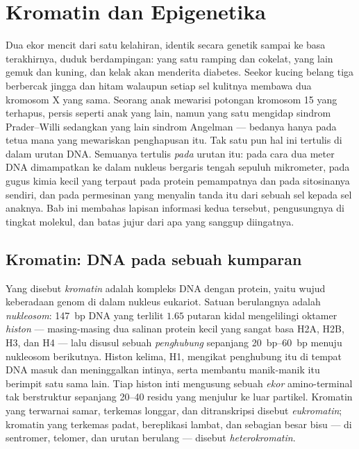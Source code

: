 \chapter{Kromatin dan Epigenetika}\label{ch:b3:chromatin-epigenetics}

Dua ekor mencit dari satu kelahiran, identik secara genetik sampai ke basa
terakhirnya, duduk berdampingan: yang satu ramping dan cokelat, yang lain
gemuk dan kuning, dan kelak akan menderita diabetes. Seekor kucing belang
tiga berbercak jingga dan hitam walaupun setiap sel kulitnya membawa dua
kromosom X yang sama. Seorang anak mewarisi potongan kromosom 15 yang
terhapus, persis seperti anak yang lain, namun yang satu mengidap sindrom
Prader--Willi sedangkan yang lain sindrom Angelman --- bedanya hanya pada
tetua mana yang mewariskan penghapusan itu. Tak satu pun hal ini tertulis di
dalam urutan DNA. Semuanya tertulis \emph{pada} urutan itu: pada cara dua
meter DNA dimampatkan ke dalam nukleus bergaris tengah sepuluh mikrometer,
pada gugus kimia kecil yang terpaut pada protein pemampatnya dan pada
sitosinanya sendiri, dan pada permesinan yang menyalin tanda itu dari sebuah
sel kepada sel anaknya. Bab ini membahas lapisan informasi kedua tersebut,
pengusungnya di tingkat molekul, dan batas jujur dari apa yang sanggup
diingatnya.

\section{Kromatin: DNA pada sebuah kumparan}

\begin{definition}\label{def:b3:chromatin-epigenetics:nucleosome}
Yang disebut \emph{kromatin} adalah kompleks DNA dengan protein, yaitu wujud
keberadaan genom di dalam nukleus eukariot. Satuan berulangnya adalah
\emph{nukleosom}: \qty{147}{bp} DNA yang terlilit $1.65$ putaran kidal
mengelilingi oktamer \emph{histon} --- masing-masing dua salinan protein
kecil yang sangat basa H2A, H2B, H3, dan H4 --- lalu disusul sebuah
\emph{penghubung} sepanjang \qtyrange{20}{60}{bp} menuju nukleosom
berikutnya. Histon kelima, H1, mengikat penghubung itu di tempat DNA masuk
dan meninggalkan intinya, serta membantu manik-manik itu berimpit satu sama
lain. Tiap histon inti mengusung sebuah \emph{ekor} amino-terminal tak
berstruktur sepanjang \numrange{20}{40} residu yang menjulur ke luar
partikel. Kromatin yang terwarnai samar, terkemas longgar, dan ditranskripsi
disebut \emph{eukromatin}; kromatin yang terkemas padat, bereplikasi lambat,
dan sebagian besar bisu --- di sentromer, telomer, dan urutan berulang ---
disebut \emph{heterokromatin}.
\end{definition}

